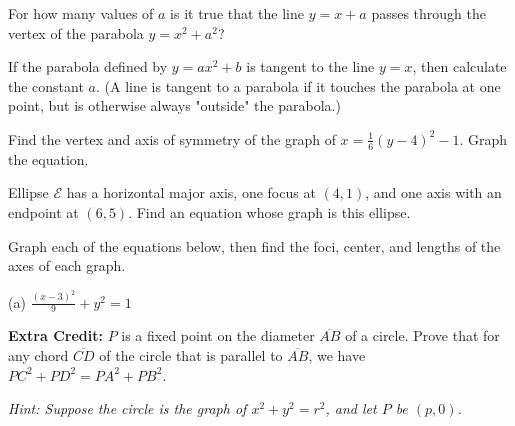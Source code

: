 \documentclass[12pt]{exam}
\begin{document}
\begin{questions}
\question[8]
For how many values of $a$ is it true that the line $y = x + a$ passes through the vertex of the parabola $y = x^2 + a^2$?
\vspace*{4cm}

\newpage

\question[10]
If the parabola defined by $y = ax^2 + b$ is tangent to the line $y = x$, then calculate the constant $a$. (A line is tangent to a parabola if it touches the parabola at one point, but is otherwise always "outside" the parabola.)
\vspace*{5cm}

\question[12]
Find the vertex and axis of symmetry of the graph of $x = \frac{1}{6}(y - 4)^2 - 1$. Graph the equation.
\vspace*{5cm}

\newpage

\question[10]
Ellipse $\mathcal{E}$ has a horizontal major axis, one focus at $(4, 1)$, and one axis with an endpoint at $(6, 5)$. Find an equation whose graph is this ellipse.
\vspace*{5cm}

\question[8]
Graph each of the equations below, then find the foci, center, and lengths of the axes of each graph.

(a) $\frac{(x-3)^2}{9} + y^2 = 1$
\vspace*{4cm}

\newpage

\textbf{Extra Credit:}
$P$ is a fixed point on the diameter $\overline{AB}$ of a circle. Prove that for any chord $\overline{CD}$ of the circle that is parallel to $\overline{AB}$, we have $PC^2 + PD^2 = PA^2 + PB^2$.

\textit{Hint: Suppose the circle is the graph of $x^2 + y^2 = r^2$, and let $P$ be $(p, 0)$.}
\vspace*{5cm}

\end{questions}
\end{document}

